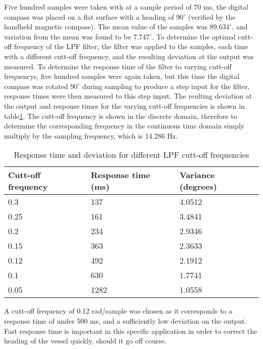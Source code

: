 Five hundred samples were taken with at a sample period of 70 ms, the digital compass was placed on a flat surface with a heading of $90^{\circ}$ (verified by the handheld magnetic compass). The mean
value of the samples was $89.634^{\circ}$, and variation from the mean was found to be $7.747^{\circ}$. To determine the optimal cutt-off frequency of the LPF filter, the filter was applied to the
samples, each time with a different cutt-off frequency, and the resulting deviation at the output was measured. To determine the response time of the filter to varying cutt-off frequencys, five 
hundred samples were again taken, but this time the digital compass was rotated $90^{\circ}$ during sampling to produce a step input for the filter, response times were then measured to this step input.
The reulting deviation at the output and response times for the varying cutt-off frequencies is shown in table\ref{table:filter}. The cutt-off frequency is shown in the discrete domain, therefore to 
determine the corresponding frequency in the continuous time domain simply multiply by the sampling frequency, which is 14.286 Hz.

\begin{table}[!h]
    \centering
    \caption{Response time and deviation for different LPF cutt-off frequencies}
    \label{table:filter}
    \begin{tabularx}{\columnwidth}{ | X | X | X | }
        
        \hline
        Cutt-off frequency & Response time (ms) & Variance (degrees)\\
        \hline
        0.3 &  137 & 4.0512 \\
        \hline
        0.25 &  161 & 3.4841 \\
        \hline
        0.2 &  234 & 2.9346 \\
        \hline
        0.15 &  363 & 2.3633 \\
        \hline
        0.12 &  492 & 2.1912 \\
        \hline
        0.1 &  630 & 1.7741 \\
        \hline
        0.05 &  1282 & 1.0558 \\
        \hline
    \end{tabularx}
\end{table}

A cutt-off frequency of 0.12 rad/sample was chosen as it corresponds to a response time of under 500 ms, and a sufficiently low deviation on the output. Fast response time is important in 
this specific application in order to correct the heading of the vessel quickly, should it go off course.

